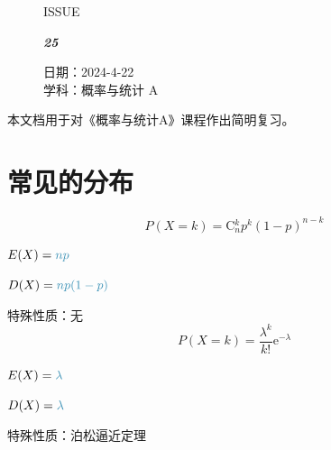 \documentclass[UTF8]{ctexart}
\newcommand\Black[1]{\textcolor[gray]{0.3}{#1}}
\newcommand\Brown[1]{\textcolor[HTML]{998A4E}{#1}}
\newcommand\means[1]{\textcolor{cyan!70!black}{#1}}
\newcommand\C{\mathrm{C}}
\newcommand\e{\mathrm{e}}
\newcommand\IssueNumber{25}
\newcommand\Date{2024-4-22}
\newcommand\Subject{概率与统计 A}
\begin{document}
\begin{figure}[H]
\hspace{1cm}
\begin{minipage}[t]{0.3\textwidth}
\centering
    \Brown{\Genshin ISSUE}

    \vspace{-0.6cm}
    \Huge \Issue\slshape\bfseries\Black{\IssueNumber}
\end{minipage}
\hfill
\begin{minipage}[t]{0.35\textwidth}
\small
\centering
    \Brown{日期：\Date} \\
\vspace{-0.1cm}
    \Brown{学科：\Subject} \\
\end{minipage}
\hspace{0.8cm}
\end{figure}

{\color{cyan!50!black}
本文档用于对《概率与统计A》课程作出简明复习。}

\section{常见的分布}
\begin{tcbitemize}[raster columns=2, raster equal height=rows, colframe=cyan!75!black, colback=cyan!5!white, fonttitle=\bfseries]
\tcbitem[squeezed title={二项分布 $X\sim B(n,p)$}]
\phantom{...}
\vspace{-1.2em}
\begin{equation*}
    P(X=k) = \C{}_n^k p^k (1-p)^{n-k}
\end{equation*}

$E(X)=\means{np}$

$D(X)=\means{np(1-p)}$

特殊性质：无
\tcbitem[squeezed title={泊松分布 $X\sim P(\lambda)$}]
\[P(X=k) = \dfrac{\lambda^k}{k!}\e^{-\lambda}\]

$E(X)=\means{\lambda}$

$D(X)=\means{\lambda}$

特殊性质：泊松逼近定理
\end{tcbitemize}
\end{document}
